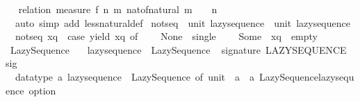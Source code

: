 \begin{isabellebody}
\isamarkupfalse%
%
\isadelimproof
\ %
\endisadelimproof
%
\isatagproof
{}\isamarkupfalse%
\ {\isacharparenleft}{\kern0pt}relation\ {\isachardoublequoteopen}measure\ {\isacharparenleft}{\kern0pt}{\isasymlambda}{\isacharparenleft}{\kern0pt}f{\isacharcomma}{\kern0pt}\ n{\isacharcomma}{\kern0pt}\ m{\isacharparenright}{\kern0pt}{\isachardot}{\kern0pt}\ nat{\isacharunderscore}{\kern0pt}of{\isacharunderscore}{\kern0pt}natural\ {\isacharparenleft}{\kern0pt}m\ {\isacharplus}{\kern0pt}\ {}\ {\isacharminus}{\kern0pt}\ n{\isacharparenright}{\kern0pt}{\isacharparenright}{\kern0pt}{\isachardoublequoteclose}{\isacharparenright}{\kern0pt}\isanewline
\ \ {\isacharparenleft}{\kern0pt}auto\ simp\ add{\isacharcolon}{\kern0pt}\ less{\isacharunderscore}{\kern0pt}natural{\isacharunderscore}{\kern0pt}def{\isacharparenright}{\kern0pt}%
\endisatagproof
{\isafoldproof}%
%
\isadelimproof
%
\endisadelimproof
\isanewline
\isanewline
{}\isamarkupfalse%
\ not{\isacharunderscore}{\kern0pt}seq\ {\isacharcolon}{\kern0pt}{\isacharcolon}{\kern0pt}\ {\isachardoublequoteopen}unit\ lazy{\isacharunderscore}{\kern0pt}sequence\ {\isasymRightarrow}\ unit\ lazy{\isacharunderscore}{\kern0pt}sequence{\isachardoublequoteclose}\isanewline
{}\isanewline
\ \ {\isachardoublequoteopen}not{\isacharunderscore}{\kern0pt}seq\ xq\ {\isacharequal}{\kern0pt}\ {\isacharparenleft}{\kern0pt}case\ yield\ xq\ of\isanewline
\ \ \ \ None\ {\isasymRightarrow}\ single\ {\isacharparenleft}{\kern0pt}{\isacharparenright}{\kern0pt}\isanewline
\ \ {\isacharbar}{\kern0pt}\ Some\ {\isacharparenleft}{\kern0pt}{\isacharparenleft}{\kern0pt}{\isacharparenright}{\kern0pt}{\isacharcomma}{\kern0pt}\ xq{\isacharparenright}{\kern0pt}\ {\isasymRightarrow}\ empty{\isacharparenright}{\kern0pt}{\isachardoublequoteclose}%
\isadelimdocument
%
\endisadelimdocument
%
\isatagdocument
%
\isamarkuptrue%
%
\endisatagdocument
{\isafolddocument}%
%
\isadelimdocument
%
\endisadelimdocument
{}\isamarkupfalse%
\ Lazy{\isacharunderscore}{\kern0pt}Sequence\isanewline
\ \ \ lazy{\isacharunderscore}{\kern0pt}sequence\ {\isacharequal}{\kern0pt}\ Lazy{\isacharunderscore}{\kern0pt}Sequence\isanewline
%
\isadelimML
\isanewline
%
\endisadelimML
%
\isatagML
{}\isamarkupfalse%
\ {\isacartoucheopen}\isanewline
signature\ LAZY{\isacharunderscore}{\kern0pt}SEQUENCE\ {\isacharequal}{\kern0pt}\isanewline
sig\isanewline
\ \ datatype\ {\isacharprime}{\kern0pt}a\ lazy{\isacharunderscore}{\kern0pt}sequence\ {\isacharequal}{\kern0pt}\ Lazy{\isacharunderscore}{\kern0pt}Sequence\ of\ {\isacharparenleft}{\kern0pt}unit\ {\isacharminus}{\kern0pt}{\isachargreater}{\kern0pt}\ {\isacharparenleft}{\kern0pt}{\isacharprime}{\kern0pt}a\ {\isacharasterisk}{\kern0pt}\ {\isacharprime}{\kern0pt}a\ Lazy{\isacharunderscore}{\kern0pt}Sequence{\isachardot}{\kern0pt}lazy{\isacharunderscore}{\kern0pt}sequence{\isacharparenright}{\kern0pt}\ option{\isacharparenright}{\kern0pt}\isanewline

\end{isabellebody}
